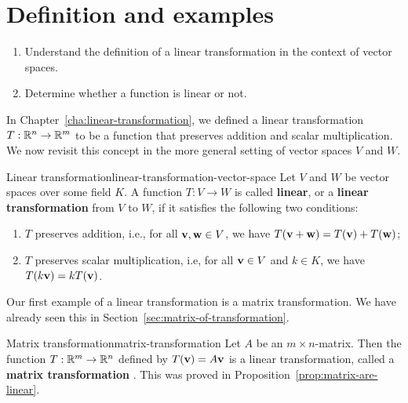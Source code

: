 \section{Definition and examples}

\begin{outcome}
  \begin{enumerate}
  \item Understand the definition of a linear transformation in the
    context of vector spaces.
  \item Determine whether a function is linear or not.
  \end{enumerate}
\end{outcome}

In Chapter~\ref{cha:linear-transformation}, we defined a linear
transformation $T:\mathbb{R}^n\to\mathbb{R}^m$ to be a function that preserves
addition and scalar multiplication. We now revisit this concept in the
more general setting of vector spaces $V$ and $W$.

\begin{definition}{Linear transformation}{linear-transformation-vector-space}
  Let $V$ and $W$ be vector spaces over some field $K$. A function
  $T: V \to W$ is called \textbf{linear}, or a \textbf{linear
    transformation}%
   from $V$ to $W$, if
  it satisfies the following two conditions:
  \begin{enumerate}
  \item $T$ preserves addition, i.e., for all\/
    $\vect{v},\vect{w}\in V$, we have
    $T(\vect{v}+\vect{w}) = T(\vect{v}) + T(\vect{w})$;
  \item $T$ preserves scalar multiplication, i.e, for all\/
    $\vect{v}\in V$ and $k\in K$, we have
    $T(k\vect{v}) = kT(\vect{v})$.
  \end{enumerate}
\end{definition}

Our first example of a linear transformation is a matrix
transformation. We have already seen this in
Section~\ref{sec:matrix-of-transformation}.

\begin{example}{Matrix transformation}{matrix-transformation}
  Let $A$ be an $m\times n$-matrix. Then the function $T:\mathbb{R}^m\to\mathbb{R}^n$
  defined by $T(\vect{v})=A\vect{v}$ is a linear transformation,
  called a \textbf{matrix transformation}%
  . This was proved in
  Proposition~\ref{prop:matrix-are-linear}.
\end{example}

